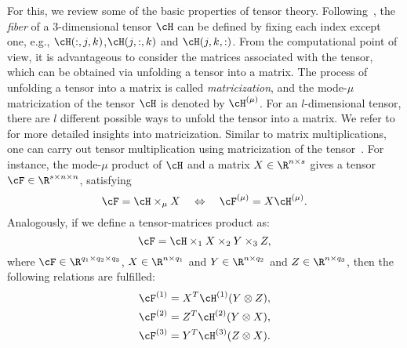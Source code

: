 For this, we review some of the basic properties of tensor theory.  Following~\cite{koldatensor09}, the \emph{fiber} of a 3-dimensional tensor $\cH$ can be defined by fixing each index except one, e.g., $\cH(:,j,k)$,$\cH(j,:,k)$ and $\cH(j,k,:)$.  From the computational  point of view, it is advantageous to consider the matrices associated with the tensor, which can be obtained via unfolding a tensor into a matrix.    The process of unfolding a tensor into a matrix is called \emph{matricization}, and  the mode-$\mu$ matricization of the tensor $\cH$ is denoted by $\cH^{(\mu)}$. For an $l$-dimensional tensor, there are $l$ different possible ways to unfold the tensor into a matrix. We refer to \cite{morBenB15,koldatensor09} for more detailed insights into matricization. Similar to matrix multiplications, one can carry out tensor multiplication using matricization of the tensor~\cite{koldatensor09}. For instance, the mode-$\mu$ product of $\cH$ and a matrix $X\in\R^{n\times s}$ gives a tensor $\cF \in\R^{s\times n\times n}$, satisfying
\begin{equation*}
 \cF = \cH\times_\mu X\quad  \Leftrightarrow   \quad \cF^{(\mu)} = X\cH^{(\mu)}.
\end{equation*}
Analogously, if we define a tensor-matrices product as:
\begin{equation*}
 \cF = \cH \times_1 X\times_2 Y\times_3 Z,
\end{equation*}
where $\cF\in \R^{q_1\times q_2\times q_3}$, $X\in \R^{n\times q_1}$ and $Y\in \R^{n\times q_2}$ and $Z \in \R^{n\times q_3}$, then the following relations are fulfilled:
\begin{subequations}\label{eq:tensor_matricization}
\begin{align}
\cF^{(1)} &= X^T\cH^{(1)}(Y\otimes Z ), \\
\cF^{(2)} &= Z^T\cH^{(2)}(Y\otimes X ) ,\\
\cF^{(3)} &= Y^T\cH^{(3)}(Z \otimes X ) .
\end{align}
\end{subequations}

